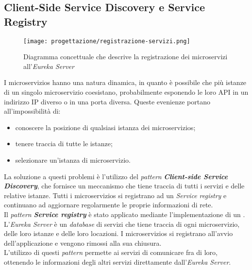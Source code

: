 \subsection{Client-Side Service Discovery e Service Registry}
\label{sub:ServiceRegistry}
\begin{figure}[H] 
    \centering 
    \texttt{[image: progettazione/registrazione-servizi.png]} 
    \caption{Diagramma concettuale che descrive la registrazione dei microservizi all'\textit{Eureka Server}}
\end{figure}
I \glspl{microservizio} hanno una natura dinamica, in quanto è possibile che più istanze di un singolo \gls{microservizio} coesistano, probabilmente esponendo le loro \gls{API} in un indirizzo \gls{IP} diverso o in una porta diversa. Queste evenienze portano all'impossibilità di: 
\begin{itemize}
    \item conoscere la posizione di qualsiasi istanza dei \glspl{microservizio};
    \item tenere traccia di tutte le istanze;
    \item selezionare un'istanza di \gls{microservizio}.
\end{itemize}
La soluzione a questi problemi è l'utilizzo del \textit{pattern} \textbf{\textit{Client-side Service Discovery}}, che fornisce un meccanismo che tiene traccia di tutti i servizi e delle relative istanze. Tutti i \glspl{microservizio} si registrano ad un \textit{Service registry} e continuano ad aggiornare regolarmente le proprie informazioni di rete.\\
Il \textit{pattern} \textbf{\textit{Service registry}} è stato applicato mediante l'implementazione di un . L'\textit{Eureka Server} è un \textit{database} di servizi che tiene traccia di ogni \gls{microservizio}, delle loro istanze e delle loro locazioni. I \glspl{microservizio} si registrano all'avvio dell'applicazione e vengono rimossi alla sua chiusura.\\
L'utilizzo di questi \textit{pattern}  permette ai servizi di comunicare fra di loro, ottenendo le informazioni degli altri servizi direttamente dall'\textit{Eureka Server}.
